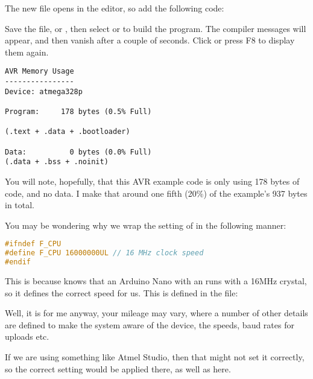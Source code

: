 The new file opens in the editor, so add the following  code:



Save the file,  or , then select  or  to build the program. The compiler messages will appear, and then vanish after a couple of seconds. Click  or press F8 to display them again.

\begin{lstlisting}[numbers={none},caption={AVR Blink Memory Usage}]
AVR Memory Usage
----------------
Device: atmega328p

Program:     178 bytes (0.5% Full)

(.text + .data + .bootloader)

Data:          0 bytes (0.0% Full)
(.data + .bss + .noinit)\end{lstlisting}

You will note, hopefully, that this AVR example code is only using 178 bytes of code, and no data. I make that around one fifth (20\%) of the   example's 937 bytes in total.

You may be wondering why we wrap the setting of  in the following manner:

\begin{lstlisting}[language=C,firstnumber=2,caption={Wrapping F\_CPU in AVRBlink.c}]
#ifndef F_CPU
#define F_CPU 16000000UL // 16 MHz clock speed
#endif
\end{lstlisting}

This is because  knows that an Arduino Nano with an  runs with a 16MHz crystal, so it defines the correct speed for us. This is defined in the file:


Well, it is for me anyway, your mileage may vary, where a number of other details are defined to make the system aware of the device, the speeds, baud rates for uploads etc.

If we are using something like Atmel Studio, then that might not set it correctly, so the correct setting would be applied there, as well as here.

